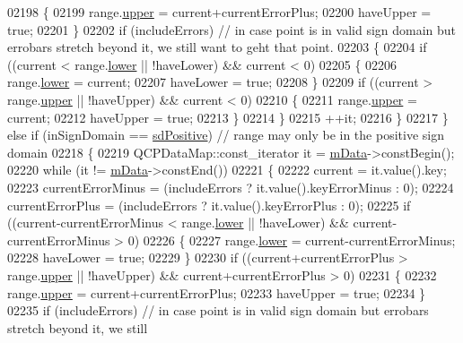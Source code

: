 \begin{DoxyCode}
02198       \{
02199         range.\hyperlink{a00049_ae44eb3aafe1d0e2ed34b499b6d2e074f}{upper} = current+currentErrorPlus;
02200         haveUpper = \textcolor{keyword}{true};
02201       \}
02202       \textcolor{keywordflow}{if} (includeErrors) \textcolor{comment}{// in case point is in valid sign domain but errobars stretch beyond it, we still
       want to geht that point.}
02203       \{
02204         \textcolor{keywordflow}{if} ((current < range.\hyperlink{a00049_aa3aca3edb14f7ca0c85d912647b91745}{lower} || !haveLower) && current < 0)
02205         \{
02206           range.\hyperlink{a00049_aa3aca3edb14f7ca0c85d912647b91745}{lower} = current;
02207           haveLower = \textcolor{keyword}{true};
02208         \}
02209         \textcolor{keywordflow}{if} ((current > range.\hyperlink{a00049_ae44eb3aafe1d0e2ed34b499b6d2e074f}{upper} || !haveUpper) && current < 0)
02210         \{
02211           range.\hyperlink{a00049_ae44eb3aafe1d0e2ed34b499b6d2e074f}{upper} = current;
02212           haveUpper = \textcolor{keyword}{true};
02213         \}
02214       \}
02215       ++it;
02216     \}
02217   \} \textcolor{keywordflow}{else} \textcolor{keywordflow}{if} (inSignDomain == \hyperlink{a00024_a661743478a1d3c09d28ec2711d7653d8a02951859f243a4d24e779cfbb5471030}{sdPositive}) \textcolor{comment}{// range may only be in the positive sign domain}
02218   \{
02219     QCPDataMap::const\_iterator it = \hyperlink{a00031_a8457c840f69a0ac49f61d30a509c5d08}{mData}->constBegin();
02220     \textcolor{keywordflow}{while} (it != \hyperlink{a00031_a8457c840f69a0ac49f61d30a509c5d08}{mData}->constEnd())
02221     \{
02222       current = it.value().key;
02223       currentErrorMinus = (includeErrors ? it.value().keyErrorMinus : 0);
02224       currentErrorPlus = (includeErrors ? it.value().keyErrorPlus : 0);
02225       \textcolor{keywordflow}{if} ((current-currentErrorMinus < range.\hyperlink{a00049_aa3aca3edb14f7ca0c85d912647b91745}{lower} || !haveLower) && current-currentErrorMinus > 0)
02226       \{
02227         range.\hyperlink{a00049_aa3aca3edb14f7ca0c85d912647b91745}{lower} = current-currentErrorMinus;
02228         haveLower = \textcolor{keyword}{true};
02229       \}
02230       \textcolor{keywordflow}{if} ((current+currentErrorPlus > range.\hyperlink{a00049_ae44eb3aafe1d0e2ed34b499b6d2e074f}{upper} || !haveUpper) && current+currentErrorPlus > 0)
02231       \{
02232         range.\hyperlink{a00049_ae44eb3aafe1d0e2ed34b499b6d2e074f}{upper} = current+currentErrorPlus;
02233         haveUpper = \textcolor{keyword}{true};
02234       \}
02235       \textcolor{keywordflow}{if} (includeErrors) \textcolor{comment}{// in case point is in valid sign domain but errobars stretch beyond it, we still
}
\end{DoxyCode}
